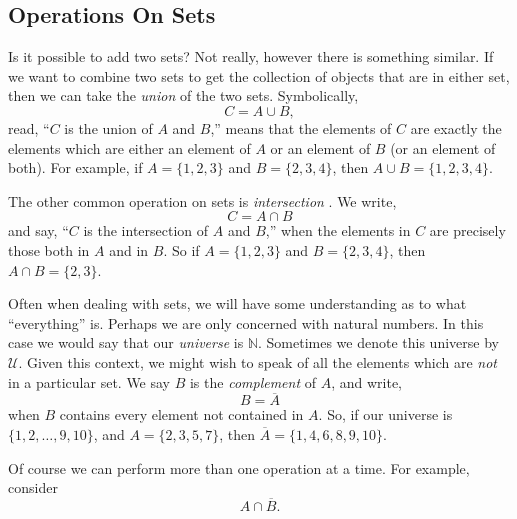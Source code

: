 \documentclass[10pt,]{book}
\theoremstyle{plain}
\theoremstyle{definition}
\theoremstyle{definition}
\theoremstyle{definition}
\def\N{\mathbb N}
\def\U{\mathcal U}
\renewcommand{\bar}{\overline}
\begin{document}
\subsection[Operations On Sets]{Operations On Sets}\label{subsection-6}

      Is it possible to add two sets? Not really, however there is something similar. If we want to combine two sets to get the collection of objects that are in either set, then we can take the \emph{union}
       of the two sets. Symbolically,
      \begin{equation*}
        C = A \cup B,
      \end{equation*}
      read, ``\(C\) is the union of \(A\) and \(B\),'' means that the elements of \(C\) are exactly the elements which are either an element of \(A\) or an element of \(B\) (or an element of both). For example, if \(A = \{1, 2, 3\}\) and \(B = \{2, 3, 4\}\), then \(A \cup B = \{1, 2, 3, 4\}\).
\par

      The other common operation on sets is \emph{intersection}
      . We write,
      \begin{equation*}
        C = A \cap B
      \end{equation*}
      and say, ``\(C\) is the intersection of \(A\) and \(B\),'' when the elements in \(C\) are precisely those both in \(A\) and in \(B\). So if \(A = \{1, 2, 3\}\) and \(B = \{2, 3, 4\}\), then \(A \cap B = \{2, 3\}\).
\par

      Often when dealing with sets, we will have some understanding as to what ``everything'' is. Perhaps we are only concerned with natural numbers. In this case we would say that our \emph{universe} is \(\N\). Sometimes we denote this universe by \(\U\). Given this context, we might wish to speak of all the elements which are \emph{not} in a particular set. We say \(B\) is the \emph{complement}
       of \(A\), and write,
      \begin{equation*}
        B = \bar A
      \end{equation*}
      when \(B\) contains every element not contained in \(A\). So, if our universe is \(\{1, 2,\ldots, 9, 10\}\), and \(A = \{2, 3, 5, 7\}\), then \(\bar A = \{1, 4, 6, 8, 9,10\}\).
\par

      Of course we can perform more than one operation at a time. For example, consider
      \begin{equation*}
        A \cap \bar B.
      \end{equation*}
\par
\end{document}
